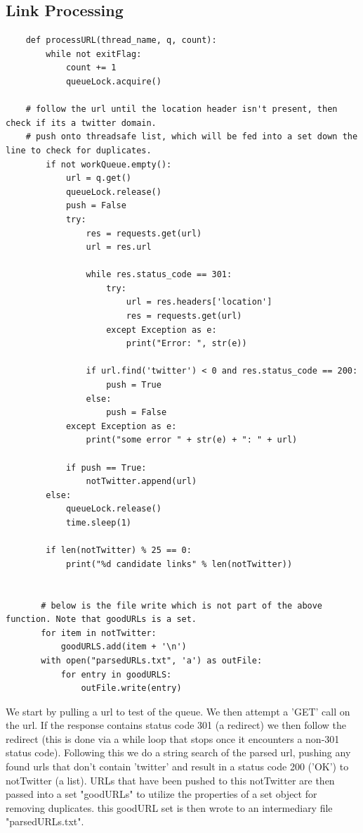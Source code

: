 \documentclass[11pt]{article}
\begin{document}
	\subsection{Link Processing}
	\begin{lstlisting}
	def processURL(thread_name, q, count):
	    while not exitFlag:
	        count += 1
	        queueLock.acquire()
	
	# follow the url until the location header isn't present, then check if its a twitter domain.
	# push onto threadsafe list, which will be fed into a set down the line to check for duplicates.
	    if not workQueue.empty():
	        url = q.get()
	        queueLock.release()
	        push = False
	        try:
	            res = requests.get(url)
	            url = res.url
	
	            while res.status_code == 301:
	                try:
	                    url = res.headers['location']
	                    res = requests.get(url)
	                except Exception as e:
	                    print("Error: ", str(e))
	
	            if url.find('twitter') < 0 and res.status_code == 200:
	                push = True
	            else:
	                push = False
	        except Exception as e:
	            print("some error " + str(e) + ": " + url)
	
	        if push == True:
	            notTwitter.append(url)
	    else:
	        queueLock.release()
	        time.sleep(1)
	
	    if len(notTwitter) % 25 == 0:
	        print("%d candidate links" % len(notTwitter))
	        
	        
	   # below is the file write which is not part of the above function. Note that goodURLs is a set. 
	   for item in notTwitter:
	       goodURLS.add(item + '\n')
	   with open("parsedURLs.txt", 'a') as outFile:
	       for entry in goodURLS:
	           outFile.write(entry)
	\end{lstlisting}
	\hspace{10mm} We start by pulling a url to test of the queue.  We then attempt a 'GET' call on the url. If the response contains status code 301 (a redirect) we then follow the redirect (this is done via a while loop that stops once it encounters a non-301 status code). Following this we do a string search of the parsed url, pushing any found urls that don't contain 'twitter' and result in a status code 200 ('OK') to notTwitter (a list). URLs that have been pushed to this notTwitter are then passed into a set "goodURLs" to utilize the properties of a set object for removing duplicates. this goodURL set is then wrote to an intermediary file "parsedURLs.txt".  
	
\end{document}
